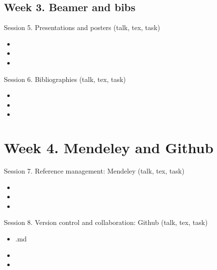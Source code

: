 \documentclass[a4paper,12pt]{article} %
\begin{document}
\vfill

\subsection*{Week 3. Beamer and bibs}
	Session 5. Presentations and posters (talk, tex, task)
	\begin{itemize}
		\item 
		\item
		\item
	\end{itemize}
	Session 6. Bibliographies (talk, tex, task)
	\begin{itemize}
		\item 
		\item
		\item
	\end{itemize}	


\section{{\color{red}Week 4. Mendeley and Github}}
	Session 7. Reference management: Mendeley (talk, tex, task)
	
	\begin{itemize}
		\item 
		\item
		\item
	\end{itemize}%
 Session 8. Version control and collaboration: Github (talk, tex, task)
	\begin{itemize}
		\item .md
		\item 
		\item
	\end{itemize}
\end{document}
